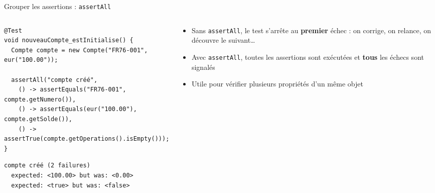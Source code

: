 \documentclass[aspectratio=169,10pt]{beamer}
\begin{document}
\begin{frame}[fragile]{Grouper les assertions : \texttt{assertAll}}
  \begin{columns}[T]
    \begin{column}{0.6\textwidth}
\begin{lstlisting}[basicstyle=\lstcode\scriptsize]
@Test
void nouveauCompte_estInitialise() {
  Compte compte = new Compte("FR76-001", eur("100.00"));

  assertAll("compte créé",
    () -> assertEquals("FR76-001", compte.getNumero()),
    () -> assertEquals(eur("100.00"), compte.getSolde()),
    () -> assertTrue(compte.getOperations().isEmpty()));
}
\end{lstlisting}
\begin{lstlisting}[style=sortie]
compte créé (2 failures)
  expected: <100.00> but was: <0.00>
  expected: <true> but was: <false>
\end{lstlisting}
    \end{column}
    \begin{column}{0.37\textwidth}
      \begin{itemize}
        \item Sans \texttt{assertAll}, le test s'arrête au \textbf{premier} échec : on corrige, on relance, on découvre le suivant\ldots
        \item Avec \texttt{assertAll}, toutes les assertions sont exécutées et \textbf{tous} les échecs sont signalés
        \item Utile pour vérifier plusieurs propriétés d'un même objet
      \end{itemize}
    \end{column}
  \end{columns}
\end{frame}
\end{document}
